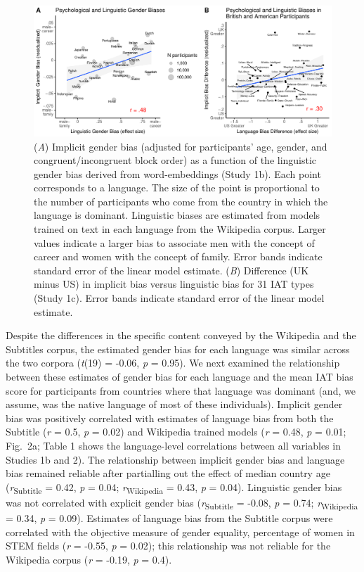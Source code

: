 \documentclass[9pt,twocolumn,twoside,lineno]{pnas-new}
\begin{document}
\begin{figure}[t!]
\centering
\includegraphics[width=17cm]{pnas_rmd/iat_lang_pnas_files/figure-latex/study1_fig.pdf}
\caption{\label{fig:unnamed-chunk-11} ({\it A})  Implicit gender bias (adjusted for participants' age, gender, and congruent/incongruent block order) as a function of the linguistic gender bias derived from word-embeddings (Study 1b). Each point corresponds to a language. The size of the point is proportional to the number of participants who come from the country in which the language is dominant. Linguistic biases are estimated from models trained on text in each language from the Wikipedia corpus. Larger values indicate a larger bias to associate men with the concept of career and women with the concept of family. Error bands indicate standard error of the linear model estimate. ({\it B}) Difference (UK minus US) in implicit bias versus linguistic bias for 31 IAT types (Study 1c). Error bands indicate standard error of the linear model
estimate.}
\end{figure}



Despite the differences in the specific content conveyed by the
Wikipedia and the Subtitles corpus, the estimated gender bias for each
language was similar across the two corpora (\emph{t}(19) = -0.06,
\emph{p} = 0.95). We next examined the relationship between these
estimates of gender bias for each language and the mean IAT bias score
for participants from countries where that language was dominant (and,
we assume, was the native language of most of these individuals).
Implicit gender bias was positively correlated with estimates of
language bias from both the Subtitle (\emph{r} = 0.5, \emph{p} = 0.02)
and Wikipedia trained models (\emph{r} = 0.48, \emph{p} = 0.01; Fig.\ 2a;
Table 1 shows the language-level correlations between all variables in
Studies 1b and 2). The relationship between implicit gender bias and
language bias remained reliable after partialling out the effect of
median country age (\emph{r}\textsubscript{Subtitle}  = 0.42, \emph{p} = 0.04;
\emph{r}\textsubscript{Wikipedia}  = 0.43, \emph{p} = 0.04). Linguistic gender bias was
not correlated with explicit gender bias (\emph{r}\textsubscript{Subtitle} = -0.08,
\emph{p} = 0.74; \emph{r}\textsubscript{Wikipedia} = 0.34, \emph{p} = 0.09). Estimates
of language bias from the Subtitle corpus were correlated with the
objective measure of gender equality, percentage of women in STEM fields
(\emph{r} = -0.55, \emph{p} = 0.02); this relationship was not reliable
for the Wikipedia corpus (\emph{r} = -0.19, \emph{p} = 0.4).
\end{document}
